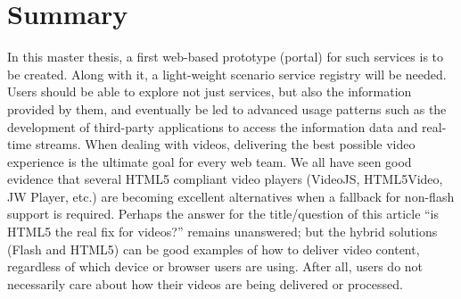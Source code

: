 \section{Summary}
	In this master thesis, a first web-based prototype (portal) for such services is to be created. Along with it, a light-weight scenario service registry will be needed. Users should be able to explore not just services, but also the information provided by them, and eventually be led to advanced usage patterns such as the development of third-party applications to access the information data and real-time streams. When dealing with videos, delivering the best possible video experience is the ultimate goal for every web team.  We all have seen good evidence that several HTML5 compliant video players (VideoJS, HTML5Video, JW Player, etc.) are becoming excellent alternatives when a fallback for non-flash support is required.  Perhaps the answer for the title/question of this article “is HTML5 the real fix for videos?” remains unanswered; but the hybrid solutions (Flash and HTML5) can be good examples of how to deliver video content, regardless of which device or browser users are using. After all, users do not necessarily care about how their videos are being delivered or processed. 